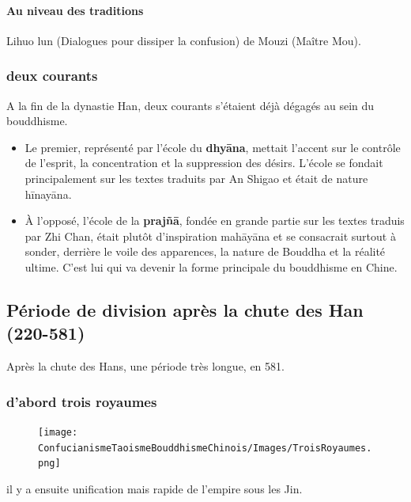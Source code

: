 \paragraph{Au niveau des traditions}
Lihuo lun (Dialogues pour dissiper la confusion) de Mouzi (Maître Mou). 

 \subsubsection{deux courants}
A la fin de la dynastie Han, deux courants s’étaient déjà dégagés au sein du bouddhisme.
\begin{itemize}
    \item  	Le premier, représenté par l’école du \textbf{dhyāna}, mettait l’accent sur le contrôle de l’esprit, la concentration et la suppression des désirs. L’école se fondait principalement sur les textes traduits par An Shigao et était de nature hīnayāna.
    
    \item	À l’opposé, l’école de la \textbf{prajñā}, fondée en grande partie sur les textes traduis par Zhi Chan, était plutôt d’inspiration mahāyāna et se consacrait surtout à sonder, derrière le voile des apparences, la nature de Bouddha et la réalité ultime. C'est lui qui va devenir la forme principale du bouddhisme en Chine. 
\end{itemize}

 





\subsection{Période de division après la chute des Han (220-581)}
Après la chute des Hans, une période très longue, en 581. 

\subsubsection{d'abord trois royaumes}

\begin{figure}[!h]
    \centering
    \texttt{[image: ConfucianismeTaoismeBouddhismeChinois/Images/TroisRoyaumes.png]}
 
    \label{fig:enter-label}
\end{figure}
 il y a ensuite unification mais rapide de l'empire sous les Jin.

